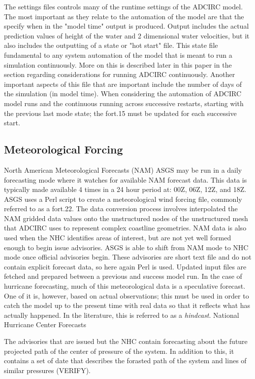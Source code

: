 \documentclass{article}
\begin{document}
The settings files controls many of the runtime settings of the ADCIRC model.
The most important as they relate to the automation of the model are that the
specify when in the "model time" output is produced. Output includes the actual
prediction values of height of the water and 2 dimensional water velocities, but
it also includes the outputting of a state or "hot start" file. This state file
fundamental to any system automation of the model that is meant to run a
simulation continuously. More on this is described later in this paper in the
section regarding considerations for running ADCIRC continuously. Another
important aspects of this file that are important include the number of days of
the simulation (in model time).  When considering the automation of ADCIRC model
runs and the continuous running across successive restarts, starting with the
previous last mode state; the fort.15 must be updated for each successive start.

\subsection{Meteorological Forcing}

North American Meteorological Forecasts (NAM) ASGS may be run in a daily
forecasting mode where it watches for available NAM forecast data. This data is
typically made available 4 times in a 24 hour period at: 00Z, 06Z, 12Z, and 18Z.
ASGS uses a Perl script to create a meteorological wind forcing file, commonly
referred to as a fort.22. The data conversion process involves interpolated the
NAM gridded data values onto the unstructured nodes of the unstructured mesh
that ADCIRC uses to represent complex coastline geometries.  NAM data is also
used when the NHC identifies areas of interest, but are not yet well formed
enough to begin issue advisories. ASGS is able to shift from NAM mode to NHC
mode once official advisories begin. These advisories are short text file and do
not contain explicit forecast data, so here again Perl is used.  Updated input
files are fetched and prepared between a previous and success model run. In the
case of hurricane forecasting, much of this meteorological data is a speculative
forecast. One of it is, however, based on actual observations; this must be used
in order to catch the model up to the present time with real data so that it
reflects what has actually happened. In the literature, this is referred to as a
\textit{hindcast}.  National Hurricane Center Forecasts

The advisories that are issued but the NHC contain forecasting about the future
projected path of the center of pressure of the system. In addition to this, it
contains a set of date that describes the forasted path of the system and lines
of similar pressures (VERIFY).
\end{document}
